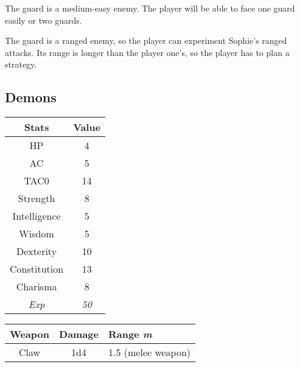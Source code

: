 The guard is a medium-easy enemy. The player will be able to face one guard easily or two guards.

The guard is a ranged enemy, so the player can experiment Sophie's ranged attacks. Its range is longer than the player one's, so the player has to plan a strategy.

\subsection{Demons}
\begin{table}[H]
  \centering
  \begin{tabular}{|c|c|}
    \hline
    \rowcolor[HTML]{C0C0C0}
    \textbf{Stats} & \textbf{Value} \\ \hline
    HP & 4 \\ \hline
    AC & 5 \\ \hline
    TAC0 & 14 \\ \hline
    Strength & 8 \\ \hline
    Intelligence & 5 \\ \hline
    Wisdom & 5  \\ \hline
    Dexterity & 10 \\ \hline
    Constitution & 13 \\ \hline
    Charisma & 8 \\ \hline
    \textit{Exp} & \textit{50} \\ \hline
  \end{tabular}
\end{table}
\begin{table}[H]
  \centering
  \begin{tabular}{|l|l|l|}
    \hline
    \rowcolor[HTML]{C0C0C0}
    \textbf{Weapon} & \textbf{Damage} & \textbf{Range \textit{m}} \\ \hline
    \multicolumn{1}{|c|}{Claw} & \multicolumn{1}{c|}{1d4} & \multicolumn{1}{c|}{1.5 (melee weapon)} \\ \hline
  \end{tabular}
\end{table}

